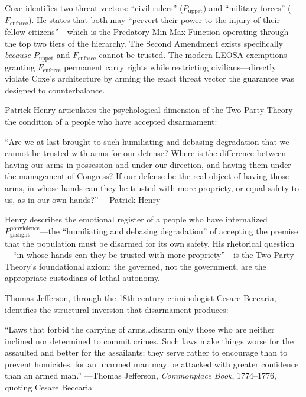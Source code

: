 Coxe identifies two threat vectors: ``civil rulers'' ($P_{\text{uppet}}$) and ``military forces'' ($F_{\text{enforce}}$). He states that both may ``pervert their power to the injury of their fellow citizens''---which is the Predatory Min-Max Function operating through the top two tiers of the hierarchy. The Second Amendment exists specifically \textit{because} $P_{\text{uppet}}$ and $F_{\text{enforce}}$ cannot be trusted. The modern LEOSA exemptions---granting $F_{\text{enforce}}$ permanent carry rights while restricting civilians---directly violate Coxe's architecture by arming the exact threat vector the guarantee was designed to counterbalance.

Patrick Henry articulates the psychological dimension of the Two-Party Theory---the condition of a people who have accepted disarmament:

\begin{historicalsource}
``Are we at last brought to such humiliating and debasing degradation that we cannot be trusted with arms for our defense? Where is the difference between having our arms in possession and under our direction, and having them under the management of Congress? If our defense be the real object of having those arms, in whose hands can they be trusted with more propriety, or equal safety to us, as in our own hands?'' \hfill ---Patrick Henry
\end{historicalsource}

Henry describes the emotional register of a people who have internalized $P_{\text{gaslight}}^{\text{nonviolence}}$---the ``humiliating and debasing degradation'' of accepting the premise that the population must be disarmed for its own safety. His rhetorical question---``in whose hands can they be trusted with more propriety''---is the Two-Party Theory's foundational axiom: the governed, not the government, are the appropriate custodians of lethal autonomy.

Thomas Jefferson, through the 18th-century criminologist Cesare Beccaria, identifies the structural inversion that disarmament produces:

\begin{historicalsource}
``Laws that forbid the carrying of arms\ldots disarm only those who are neither inclined nor determined to commit crimes\ldots Such laws make things worse for the assaulted and better for the assailants; they serve rather to encourage than to prevent homicides, for an unarmed man may be attacked with greater confidence than an armed man.'' \hfill ---Thomas Jefferson, \textit{Commonplace Book}, 1774--1776, quoting Cesare Beccaria
\end{historicalsource}


